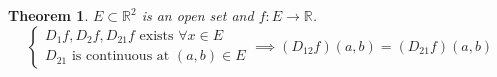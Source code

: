 \documentclass[aps,pra,onecolumn,notitlepage,superscriptaddress]{revtex4-1}
\newcommand{\R}{\mathbb{R}}
\newtheorem{theo}{Theorem}
\begin{document}
    \begin{theo}
        $E \subset \R^2$ is an open set and $f: E \to \R$.
        \begin{equation}
            \begin{cases}
                D_1 f, D_2 f, D_{21}f \text{ exists } \forall x \in E \\
                D_{21} \text{ is continuous at } (a,b) \in E
            \end{cases}
            \implies (D_{12}f)(a,b) = (D_{21}f)(a,b)
        \end{equation}
    \end{theo}

    
\end{document}
